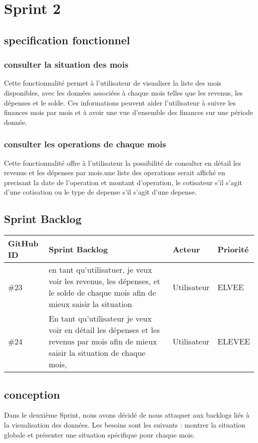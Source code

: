 \section{Sprint 2}
\subsection{specification fonctionnel}
\subsubsection{consulter la situation des mois}
Cette fonctionnalité permet à l'utilisateur de visualiser la liste des mois disponibles, avec les données associées à chaque mois telles que les revenus, les dépenses et le solde. Ces informations peuvent aider l'utilisateur à suivre les finances mois par mois et à avoir une vue d'ensemble des finances sur une période donnée.
\subsubsection{consulter les operations de chaque mois}
Cette fonctionnalité offre à l'utilisateur la possibilité de consulter en détail les revenus et les dépenses par mois.une liste des operations serait affiché en precisant la date de l'operation et montant d'operation, le cotisateur s'il s'agit d'une cotisation ou le type de depense s'il s'agit d'une depense.

\subsection{Sprint Backlog}
\begin{center}
  \begin{tabular}{ | m{1cm} | m{9cm}| m{2cm} | m{2cm} |} 
   \hline
   GitHub ID & Sprint Backlog & Acteur & Priorité \\ [0.5ex] 
   \hline\hline
   \#23 & en tant qu'utilisatuer, je veux voir les revenus, les dépenses, et le solde de chaque mois afin de mieux saisir la situation & Utilisateur & ELVEE \\ 
   \hline
   \#24  & En tant qu'utilisateur je veux voir en détail les dépenses et les revenus par mois afin de mieux saisir la situation de chaque mois, & Utilisateur & ELEVEE \\
   \hline
  \end{tabular}
\end{center}
\subsection{conception}
Dans le deuxième Sprint, nous avons décidé de nous attaquer aux backlogs liés à la visualisation des données. Les besoins sont les suivants : montrer la situation globale et présenter une situation spécifique pour chaque mois.
